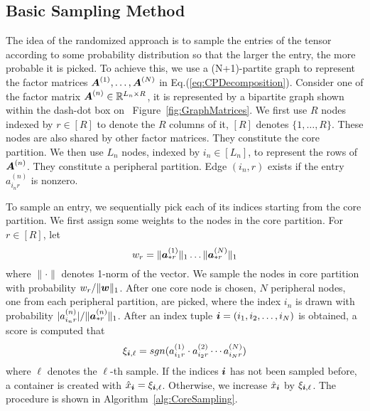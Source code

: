 \documentclass[letterpaper]{article}
\newcommand{\Sca}[3]{{#1}^{(#2)}_{i_#2#3}}%
\newcommand{\anr}[2]{\Sca{a}{#1}{#2}}
\newcommand{\score}[1]{\xi_{\V{i},#1}}
\newcommand{\V}[1]{{\boldsymbol{{\MakeLowercase{#1}}}}}
\newcommand{\ColVec}[3]{\V{#1}^{(#2)}_{#3}}
\newcommand{\NormColA}[2]{\norm{\ColVec{a}{#1}{*#2}}{1}}
\newcommand{\ColVecA}[1]{\V{a}^{(#1)}_{*r}}
\newcommand{\coord}{(i_1,i_2,\ldots,i_N)}
\newcommand{\WeightR}{\NormColA{1}{r}\ldots\NormColA{N}{r}}
\newcommand{\predx}{\hat{x}_{\V{i}}}
\newcommand{\M}[1]{{\boldsymbol{{\MakeUppercase{#1}}}}}
\newcommand{\FacMat}[2]{\M{#1}^{(#2)}}
\newcommand{\norm}[2]{\|#1\|_{#2}}
\newcommand{\Eqn}[1]{Eq.(\ref{eq:#1})}
\newcommand{\Fig}[1]{Figure~\ref{fig:#1}}
\newcommand{\Alg}[1]{Algorithm~\ref{alg:#1}}
\begin{document}
\subsection{Basic Sampling Method}
The idea of the randomized approach is 
to sample the entries of the tensor according to some probability distribution 
so that the larger the entry, the more probable it is picked. 
To achieve this, we use a (N+1)-partite graph to represent the factor matrices
$\FacMat{A}{1},\ldots,\FacMat{A}{N}$ in \Eqn{CPDecomposition}.
Consider one of the factor matrix $\FacMat{A}{n}\in \mathbb{R}^{L_n \times R}$,
it is represented by a bipartite graph shown within the dash-dot box on ~\Fig{GraphMatrices}.
We first use $R$ nodes indexed by $r\in[R]$ to denote the $R$ columns of it,
$[R]$ denotes $\{1,\ldots,R\}$.
These nodes are also shared by other factor matrices.
They constitute the core partition.
We then use $L_n$ nodes, indexed by $i_n\in [L_n]$,
to represent the rows of $\FacMat{A}{n}$.
They constitute a peripheral partition. 
Edge $(i_n,r)$ exists if the entry $\anr{n}{r}$ is nonzero.

To sample an entry, we sequentially pick each of its indices
starting from the core partition. 
We first assign some weights to the nodes in the core partition. 
For $r\in[R]$, let
\begin{equation}
    w_r = \WeightR
\end{equation}
where $\|\cdot\|$ denotes 1-norm of the vector.
We sample the nodes in core partition with probability $w_r/\norm{\V{W}}{1}$. 
After one core node is chosen, 
$N$ peripheral nodes, one from each peripheral partition, are picked, 
where the index $i_n$ is drawn with probability $|\anr{n}{r}|/\norm{\ColVecA{n}}{1}$. 
After an index tuple $\V{i}=\coord$ is obtained, 
a score is computed that
\begin{align}
\score{\ell}  = sgn(\anr{1}{r}\cdot\anr{2}{r}\cdots\anr{N}{r})
\end{align}
where $\ell$ denotes the $\ell$-th sample. 
If the indices $\V{i}$ has not been sampled before, 
a container is created with $\predx = \score{\ell}$. 
Otherwise, we increase $\predx$ by $\score{\ell}$. 
The procedure is shown in \Alg{CoreSampling}.
\end{document}
